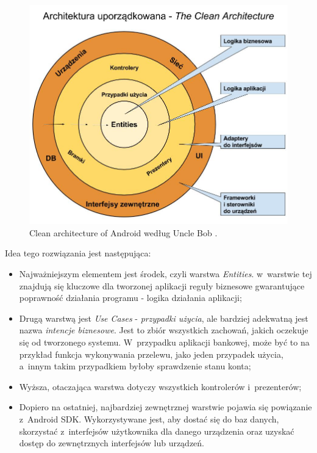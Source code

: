 \begin{figure}[!htb]
    \centering
    \includegraphics[width=12cm]{imgs/ch4_clean_architecture_pl.jpg}
    \caption
{Clean architecture of Android według Uncle Bob  \cite{website:cecil:blog}.}
    \label{fig:clean_architecture}
\end{figure} 

Idea tego rozwiązania jest następująca:

\begin{itemize}

\item
Najważniejszym elementem jest środek, czyli warstwa \textit{Entities}. w~warstwie tej znajdują się kluczowe dla tworzonej aplikacji reguły biznesowe gwarantujące poprawność działania programu - logika działania aplikacji;
\item
Drugą warstwą jest \textit{Use Cases} - \textit{przypadki użycia}, ale bardziej adekwatną jest nazwa \textit{intencje biznesowe}. Jest to zbiór wszystkich zachowań, jakich oczekuje się od tworzonego systemu. W~przypadku aplikacji bankowej, może być to na przykład funkcja wykonywania przelewu, jako jeden przypadek użycia, a~innym takim przypadkiem byłoby sprawdzenie stanu konta;
\item
Wyższa, otaczająca warstwa dotyczy wszystkich kontrolerów i~prezenterów; 
\item
Dopiero na ostatniej, najbardziej zewnętrznej warstwie pojawia się powiązanie z~Android SDK. Wykorzystywane jest, aby dostać się do baz danych, skorzystać z~interfejsów użytkownika dla danego urządzenia oraz uzyskać dostęp do zewnętrznych interfejsów lub urządzeń.
\end{itemize}

